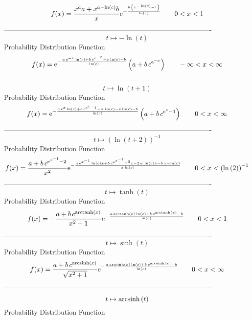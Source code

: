 \documentclass[12pt]{article}
\begin{document}
$$  f(x)={\frac {{x}^{a}a+{x}^{a-\ln  \left( c \right) }b}{x}{{\rm e}^{-{\frac 
{b\, \left( {x}^{-\ln  \left( c \right) }-1 \right) }{\ln  \left( c
 \right) }}}}}
 \qquad0
 < x < 1
$$-------------------------------------------------------------------------------------------  \\$$t\mapsto -\ln  \left( t \right) 
$$Probability Distribution Function 
$$  f(x)={{\rm e}^{-{\frac {a\,{{\rm e}^{-x}}\ln  \left( c \right) +b\,{c}^{{
{\rm e}^{-x}}}+x\ln  \left( c \right) -b}{\ln  \left( c \right) }}}}
 \left( a+b\,{c}^{{{\rm e}^{-x}}} \right) 
 \qquad-\infty 
 < x < \infty 
$$-------------------------------------------------------------------------------------------  \\$$t\mapsto \ln  \left( t+1 \right) 
$$Probability Distribution Function 
$$  f(x)={{\rm e}^{-{\frac {a\,{{\rm e}^{x}}\ln  \left( c \right) +b\,{c}^{{
{\rm e}^{x}}-1}-a\,\ln  \left( c \right) -x\ln  \left( c \right) -b}{
\ln  \left( c \right) }}}} \left( a+b\,{c}^{{{\rm e}^{x}}-1} \right) 
 \qquad0
 < x < \infty 
$$-------------------------------------------------------------------------------------------  \\$$t\mapsto  \left( \ln  \left( t+2 \right)  \right) ^{-1}
$$Probability Distribution Function 
$$  f(x)={\frac {a+b\,{c}^{{{\rm e}^{{x}^{-1}}}-2}}{{x}^{2}}{{\rm e}^{-{\frac {
a\,{{\rm e}^{{x}^{-1}}}\ln  \left( c \right) x+b\,{c}^{{{\rm e}^{{x}^{
-1}}}-2}x-2\,a\,\ln  \left( c \right) x-b\,x-\ln  \left( c \right) }{x
\ln  \left( c \right) }}}}}
 \qquad0
 < x <  \left( \ln  \left( 2 \right)  \right) ^{-1}
$$-------------------------------------------------------------------------------------------  \\$$t\mapsto \tanh \left( t \right) 
$$Probability Distribution Function 
$$  f(x)=-{\frac {a+b\,{c}^{{\rm arctanh} \left(x\right)}}{{x}^{2}-1}{{\rm e}^{
-{\frac {a\,{\rm arctanh} \left(x\right)\ln  \left( c \right) +b\,{c}^
{{\rm arctanh} \left(x\right)}-b}{\ln  \left( c \right) }}}}}
 \qquad0
 < x < 1
$$-------------------------------------------------------------------------------------------  \\$$t\mapsto \sinh \left( t \right) 
$$Probability Distribution Function 
$$  f(x)={\frac {a+b\,{c}^{{\rm arcsinh} \left(x\right)}}{\sqrt {{x}^{2}+1}}{
{\rm e}^{-{\frac {a\,{\rm arcsinh} \left(x\right)\ln  \left( c
 \right) +b\,{c}^{{\rm arcsinh} \left(x\right)}-b}{\ln  \left( c
 \right) }}}}}
 \qquad0
 < x < \infty 
$$-------------------------------------------------------------------------------------------  \\$$t\mapsto {\rm arcsinh} \left(t\right)
$$Probability Distribution Function 
\end{document}
